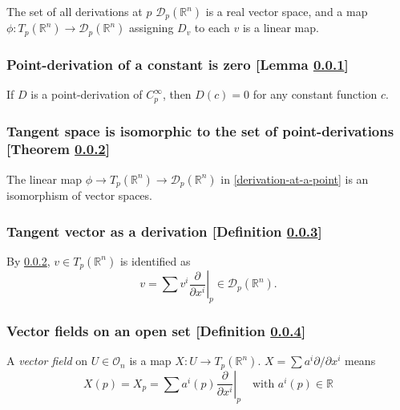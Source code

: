 \documentclass[13pt,uplatex,dvipdfmx]{jsarticle}
\theoremstyle{definition}
\newcommand{\bb}[1]{\mathbb{#1}}
\newcommand{\pfrac}[2]{\frac{\partial #1}{\partial #2}}
\begin{document}
The set of all derivations at $p$ $\mathcal{D}_p(\bb{R}^n)$ is a real vector space, and a map $\phi \colon T_p(\bb{R}^n) \to \mathcal{D}_p(\bb{R}^n)$ assigning $D_v$ to each $v$ is a linear map.

\subsubsection{Point-derivation of a constant is zero [Lemma \ref{point-derivation-of-a-constant-is-zero}]}\label{point-derivation-of-a-constant-is-zero}
If $D$ is a point-derivation of $C_p^\infty$, then $D(c) = 0$ for any constant function $c$.

\subsubsection{Tangent space is isomorphic to the set of point-derivations [Theorem \ref{tangent-space-is-isomorphic-to-the-set-of-point-derivations}]}\label{tangent-space-is-isomorphic-to-the-set-of-point-derivations}
The linear map $\phi \to T_p(\bb{R}^n) \to \mathcal{D}_p(\bb{R}^n)$ in \ref{derivation-at-a-point} is an isomorphism of vector spaces.

\subsubsection{Tangent vector as a derivation [Definition \ref{tangent-vector-as-a-derivation}]}\label{tangent-vector-as-a-derivation}
By \ref{tangent-space-is-isomorphic-to-the-set-of-point-derivations}, $v \in T_p(\bb{R}^n)$ is identified as
\[
v = \sum v^i \left.\pfrac{}{x^i}\right|_p \in \mathcal{D}_p(\bb{R}^n).
\]

\subsubsection{Vector fields on an open set [Definition \ref{vector-fields-on-an-open-set}]}\label{vector-fields-on-an-open-set}
A \textit{vector field} on $U \in \mathcal{O}_n$ is a map $X \colon U \to T_p(\bb{R}^n)$. $X = \sum a^i \partial / \partial x^i$ means
\[
X(p) = X_p = \sum a^i(p) \left. \pfrac{}{x^i} \right|_p \quad \text{with } a^i (p) \in \bb{R}
\]


\nocite{loring}


\end{document}
